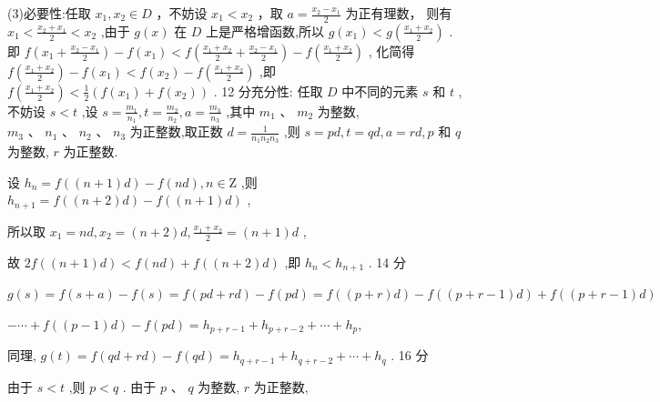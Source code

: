 \documentclass[10pt]{article}
\begin{document}
(3)必要性:任取 \({x}_{1},{x}_{2} \in  D\) ，不妨设 \({x}_{1} < {x}_{2}\) ，取 \(a = \frac{{x}_{2} - {x}_{1}}{2}\) 为正有理数， 则有 \({x}_{1} < \frac{{x}_{2} + {x}_{1}}{2} < {x}_{2}\) ,由于 \(g\left( x\right)\) 在 \(D\) 上是严格增函数,所以 \(g\left( {x}_{1}\right)  < g\left( \frac{{x}_{1} + {x}_{2}}{2}\right)\) . 即 \(f\left( {{x}_{1} + \frac{{x}_{2} - {x}_{1}}{2}}\right)  - f\left( {x}_{1}\right)  < f\left( {\frac{{x}_{1} + {x}_{2}}{2} + \frac{{x}_{2} - {x}_{1}}{2}}\right)  - f\left( \frac{{x}_{1} + {x}_{2}}{2}\right)\) , 化简得 \(f\left( \frac{{x}_{1} + {x}_{2}}{2}\right)  - f\left( {x}_{1}\right)  < f\left( {x}_{2}\right)  - f\left( \frac{{x}_{1} + {x}_{2}}{2}\right)\) ,即 \(f\left( \frac{{x}_{1} + {x}_{2}}{2}\right)  < \frac{1}{2}\left( {f\left( {x}_{1}\right)  + f\left( {x}_{2}\right) }\right)\) . 12 分充分性: 任取 \(D\) 中不同的元素 \(s\) 和 \(t\) ,不妨设 \(s < t\) ,设 \(s = \frac{{m}_{1}}{{n}_{1}},t = \frac{{m}_{2}}{{n}_{2}},a = \frac{{m}_{3}}{{n}_{3}}\) ,其中 \({m}_{1}\) 、 \({m}_{2}\) 为整数, \({m}_{3}\text{ 、 }{n}_{1}\text{ 、 }{n}_{2}\text{ 、 }{n}_{3}\) 为正整数,取正数 \(d = \frac{1}{{n}_{1}{n}_{2}{n}_{3}}\) ,则 \(s = {pd},t = {qd},a = {rd},p\) 和 \(q\) 为整数, \(r\) 为正整数.

设 \({h}_{n} = f\left( {\left( {n + 1}\right) d}\right)  - f\left( {nd}\right) ,n \in  \mathrm{Z}\) ,则 \({h}_{n + 1} = f\left( {\left( {n + 2}\right) d}\right)  - f\left( {\left( {n + 1}\right) d}\right)\) ,

所以取 \({x}_{1} = {nd},{x}_{2} = \left( {n + 2}\right) d,\frac{{x}_{1} + {x}_{2}}{2} = \left( {n + 1}\right) d\) ,

故 \({2f}\left( {\left( {n + 1}\right) d}\right)  < f\left( {nd}\right)  + f\left( {\left( {n + 2}\right) d}\right)\) ,即 \({h}_{n} < {h}_{n + 1}\) . 14 分

\(g\left( s\right)  = f\left( {s + a}\right)  - f\left( s\right)  = f\left( {{pd} + {rd}}\right)  - f\left( {pd}\right)  = f\left( {\left( {p + r}\right) d}\right)  - f\left( {\left( {p + r - 1}\right) d}\right)  + f\left( {\left( {p + r - 1}\right) d}\right)\)

\(- \cdots  + f\left( {\left( {p - 1}\right) d}\right)  - f\left( {pd}\right)  = {h}_{p + r - 1} + {h}_{p + r - 2} + \cdots  + {h}_{p},\)

同理, \(g\left( t\right)  = f\left( {{qd} + {rd}}\right)  - f\left( {qd}\right)  = {h}_{q + r - 1} + {h}_{q + r - 2} + \cdots  + {h}_{q}\) . 16 分

由于 \(s < t\) ,则 \(p < q\) . 由于 \(p\text{ 、 }q\) 为整数, \(r\) 为正整数,
\end{document}
